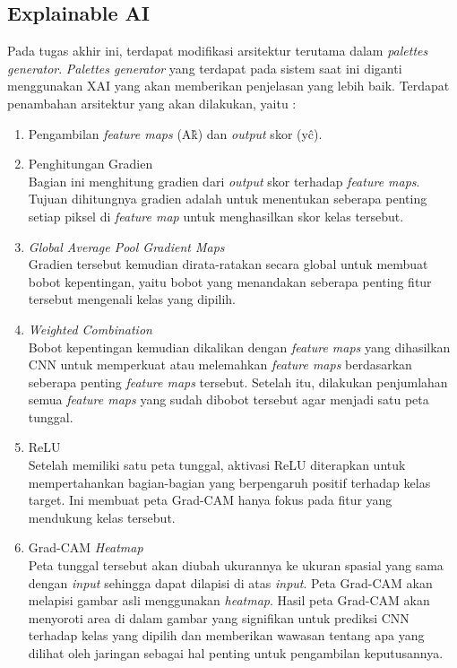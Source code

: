 \subsection{Explainable AI}

Pada tugas akhir ini, terdapat modifikasi arsitektur terutama dalam \textit{palettes generator}. \textit{Palettes generator} yang terdapat pada sistem saat ini diganti menggunakan XAI yang akan memberikan penjelasan yang lebih baik. Terdapat penambahan arsitektur yang akan dilakukan, yaitu \cite{Cea2017GradCAM}:

\begin{enumerate}
	\item Pengambilan \textit{feature maps} (A\^k) dan \textit{output} skor (y\^c). 
	\item Penghitungan Gradien\\
	Bagian ini menghitung gradien dari \textit{output} skor terhadap \textit{feature maps}. Tujuan dihitungnya gradien adalah untuk menentukan seberapa penting setiap piksel di \textit{feature map} untuk menghasilkan skor kelas tersebut.
	\item \textit{Global Average Pool Gradient Maps}\\
	Gradien tersebut kemudian dirata-ratakan secara global untuk membuat bobot kepentingan, yaitu bobot yang menandakan seberapa penting fitur tersebut mengenali kelas yang dipilih.
	\item \textit{Weighted Combination}\\
	Bobot kepentingan kemudian dikalikan dengan \textit{feature maps} yang dihasilkan CNN untuk memperkuat atau melemahkan \textit{feature maps} berdasarkan seberapa penting \textit{feature maps} tersebut. Setelah itu, dilakukan penjumlahan semua \textit{feature maps} yang sudah dibobot tersebut agar menjadi satu peta tunggal.
	\item ReLU\\
	Setelah memiliki satu peta tunggal, aktivasi ReLU diterapkan untuk mempertahankan bagian-bagian yang berpengaruh positif terhadap kelas target. Ini membuat peta Grad-CAM hanya fokus pada fitur yang mendukung kelas tersebut.
	\item Grad-CAM \textit{Heatmap}\\
	Peta tunggal tersebut akan diubah ukurannya ke ukuran spasial yang sama dengan \textit{input} sehingga dapat dilapisi di atas \textit{input}. Peta Grad-CAM akan melapisi gambar asli menggunakan \textit{heatmap}. Hasil peta Grad-CAM akan menyoroti area di dalam gambar yang signifikan untuk prediksi CNN terhadap kelas yang dipilih dan memberikan wawasan tentang apa yang dilihat oleh jaringan sebagai hal penting untuk pengambilan keputusannya.
\end{enumerate}

